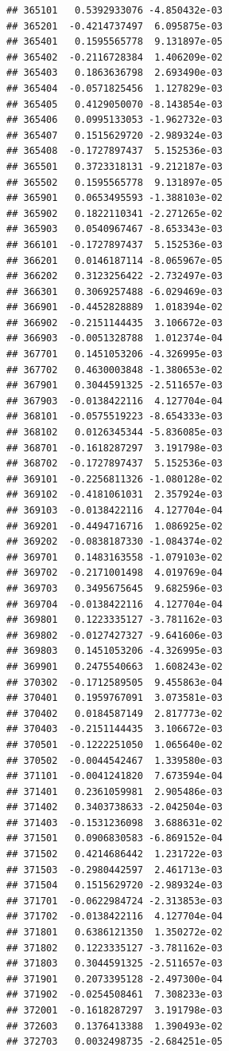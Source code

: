 \begin{frame}[fragile]
\begin{verbatim}
## 365101   0.5392933076 -4.850432e-03
## 365201  -0.4214737497  6.095875e-03
## 365401   0.1595565778  9.131897e-05
## 365402  -0.2116728384  1.406209e-02
## 365403   0.1863636798  2.693490e-03
## 365404  -0.0571825456  1.127829e-03
## 365405   0.4129050070 -8.143854e-03
## 365406   0.0995133053 -1.962732e-03
## 365407   0.1515629720 -2.989324e-03
## 365408  -0.1727897437  5.152536e-03
## 365501   0.3723318131 -9.212187e-03
## 365502   0.1595565778  9.131897e-05
## 365901   0.0653495593 -1.388103e-02
## 365902   0.1822110341 -2.271265e-02
## 365903   0.0540967467 -8.653343e-03
## 366101  -0.1727897437  5.152536e-03
## 366201   0.0146187114 -8.065967e-05
## 366202   0.3123256422 -2.732497e-03
## 366301   0.3069257488 -6.029469e-03
## 366901  -0.4452828889  1.018394e-02
## 366902  -0.2151144435  3.106672e-03
## 366903  -0.0051328788  1.012374e-04
## 367701   0.1451053206 -4.326995e-03
## 367702   0.4630003848 -1.380653e-02
## 367901   0.3044591325 -2.511657e-03
## 367903  -0.0138422116  4.127704e-04
## 368101  -0.0575519223 -8.654333e-03
## 368102   0.0126345344 -5.836085e-03
## 368701  -0.1618287297  3.191798e-03
## 368702  -0.1727897437  5.152536e-03
## 369101  -0.2256811326 -1.080128e-02
## 369102  -0.4181061031  2.357924e-03
## 369103  -0.0138422116  4.127704e-04
## 369201  -0.4494716716  1.086925e-02
## 369202  -0.0838187330 -1.084374e-02
## 369701   0.1483163558 -1.079103e-02
## 369702  -0.2171001498  4.019769e-04
## 369703   0.3495675645  9.682596e-03
## 369704  -0.0138422116  4.127704e-04
## 369801   0.1223335127 -3.781162e-03
## 369802  -0.0127427327 -9.641606e-03
## 369803   0.1451053206 -4.326995e-03
## 369901   0.2475540663  1.608243e-02
## 370302  -0.1712589505  9.455863e-04
## 370401   0.1959767091  3.073581e-03
## 370402   0.0184587149  2.817773e-02
## 370403  -0.2151144435  3.106672e-03
## 370501  -0.1222251050  1.065640e-02
## 370502  -0.0044542467  1.339580e-03
## 371101  -0.0041241820  7.673594e-04
## 371401   0.2361059981  2.905486e-03
## 371402   0.3403738633 -2.042504e-03
## 371403  -0.1531236098  3.688631e-02
## 371501   0.0906830583 -6.869152e-04
## 371502   0.4214686442  1.231722e-03
## 371503  -0.2980442597  2.461713e-03
## 371504   0.1515629720 -2.989324e-03
## 371701  -0.0622984724 -2.313853e-03
## 371702  -0.0138422116  4.127704e-04
## 371801   0.6386121350  1.350272e-02
## 371802   0.1223335127 -3.781162e-03
## 371803   0.3044591325 -2.511657e-03
## 371901   0.2073395128 -2.497300e-04
## 371902  -0.0254508461  7.308233e-03
## 372001  -0.1618287297  3.191798e-03
## 372603   0.1376413388  1.390493e-02
## 372703   0.0032498735 -2.684251e-05

\end{verbatim}
\end{frame}
